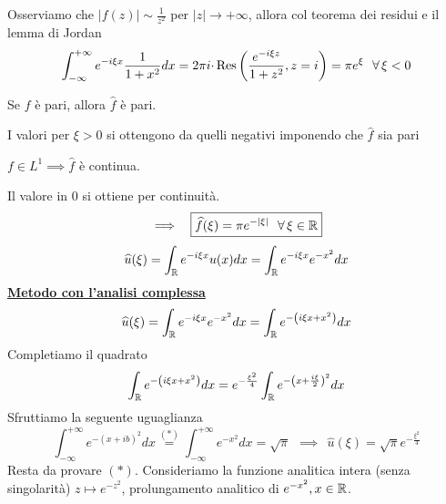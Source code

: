 \FloatBarrier

Osserviamo che $| f( z)| \sim \frac{1}{z^{2}}$ per $| z| \rightarrow +\infty $, allora col teorema dei residui e il lemma di Jordan
\begin{equation*}
\int ^{+\infty }_{-\infty } e^{-i\xi x}\frac{1}{1+x^{2}} dx=2\pi i\cdotp \Res \left(\frac{e^{-i\xi z}}{1+z^{2}} ,z=i\right) =\pi e^{\xi } \ \ \forall \xi < 0
\end{equation*}
\begin{rem}
Se $f$ è pari, allora $\hat{f}$ è pari.
\end{rem}
I valori per $\xi  >0$ si ottengono da quelli negativi imponendo che $\hat{f}$ sia pari
\begin{rem}
$f\in L^{1} \implies \hat{f}$ è continua.
\end{rem}
Il valore in $0$ si ottiene per continuità.
\begin{equation*}
\implies \ \ \boxed{\hat{f}( \xi ) =\pi e^{-| \xi | } \ \ \forall \xi \in \RR }
\end{equation*}
\Soluzione
\begin{equation*}
\widehat{u}( \xi ) =\int _{\mathbb{R} } e^{-i\xi x} u( x) dx=\int _{\mathbb{R} } e^{-i\xi x} e^{-x^{2}} dx
\end{equation*}
\textbf{\underline{Metodo con l'analisi complessa}}
\begin{equation*}
\widehat{u}( \xi ) =\int _{\mathbb{R} } e^{-i\xi x} e^{-x^{2}} dx=\int _{\mathbb{R} } e^{-\left( i\xi x+x^{2}\right)} dx
\end{equation*}
Completiamo il quadrato
\begin{equation*}
\int _{\mathbb{R} } e^{-\left( i\xi x+x^{2}\right)} dx=e^{-\frac{\xi ^{2}}{4}}\int _{\mathbb{R} } e^{-\left( x+\frac{i\xi }{2}\right)^{2}} dx
\end{equation*}
Sfruttiamo la seguente uguaglianza
\begin{equation*}
\int ^{+\infty }_{-\infty } e^{-( x+ib)^{2}} dx\overset{( *)}{=}\int ^{+\infty }_{-\infty } e^{-x^{2}} dx=\sqrt{\pi } \ \ \implies \ \ \boxed{\hat{u}( \xi ) =\sqrt{\pi } e^{-\frac{\xi ^{2}}{4}}}
\end{equation*}
Resta da provare $( *)$. Consideriamo la funzione analitica intera (senza singolarità) $z\mapsto e^{-z^{2}}$, prolungamento analitico di $e^{-x^{2}} ,x\in \mathbb{R} $.


